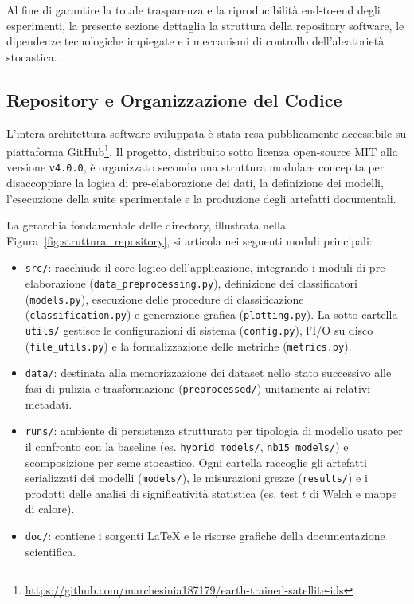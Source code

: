 Al fine di garantire la totale trasparenza e la riproducibilità end-to-end degli esperimenti, la presente sezione dettaglia la struttura della repository software, le dipendenze tecnologiche impiegate e i meccanismi di controllo dell'aleatorietà stocastica.

\subsection{Repository e Organizzazione del Codice}
\label{subsec:repository}

L'intera architettura software sviluppata è stata resa pubblicamente accessibile su piattaforma GitHub\footnote{\url{https://github.com/marchesinia187179/earth-trained-satellite-ids}}. 
Il progetto, distribuito sotto licenza open-source MIT alla versione \texttt{v4.0.0}, è organizzato secondo una struttura modulare concepita per disaccoppiare la logica di pre-elaborazione dei dati, la definizione dei modelli, l'esecuzione della suite sperimentale e la produzione degli artefatti documentali.

La gerarchia fondamentale delle directory, illustrata nella Figura~\ref{fig:struttura_repository}, si articola nei seguenti moduli principali:
\begin{itemize}
    \item \texttt{src/}: racchiude il core logico dell'applicazione, integrando i moduli di pre-elaborazione (\texttt{data\_preprocessing.py}), definizione dei classificatori (\texttt{models.py}), esecuzione delle procedure di classificazione (\texttt{classification.py}) e generazione grafica (\texttt{plotting.py}). La sotto-cartella \texttt{utils/} gestisce le configurazioni di sistema (\texttt{config.py}), l'I/O su disco (\texttt{file\_utils.py}) e la formalizzazione delle metriche (\texttt{metrics.py}).
    \item \texttt{data/}: destinata alla memorizzazione dei dataset nello stato successivo alle fasi di pulizia e trasformazione (\texttt{preprocessed/}) unitamente ai relativi metadati.
    \item \texttt{runs/}: ambiente di persistenza strutturato per tipologia di modello usato per il confronto con la baseline (es. \texttt{hybrid\_models/}, \texttt{nb15\_models/}) e scomposizione per seme stocastico. Ogni cartella raccoglie gli artefatti serializzati dei modelli (\texttt{models/}), le misurazioni grezze (\texttt{results/}) e i prodotti delle analisi di significatività statistica (es. test $t$ di Welch e mappe di calore).
    \item \texttt{doc/}: contiene i sorgenti \LaTeX{} e le risorse grafiche della documentazione scientifica.
\end{itemize}

